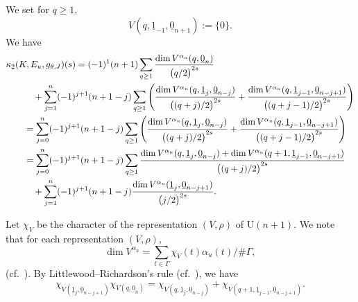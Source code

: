 \documentclass[pdftex]{sigma}
\numberwithin{equation}{section}
\DeclareMathOperator{\Tr}{Tr}
\begin{document}
We set for $q \geq 1$,
\[
 V ( q, \underline{1}_{-1} ,\underline{0}_{n+1} )
 := \{ 0 \}
 .
\]
We have
\begin{align}
 & \kappa_{2} (K, E_{u} , g_{\theta , J} ) (s)
 =
 (-1 )^{1} (n+1)
 \sum_{q \geq 1 }
 \frac{
 \dim V^{\alpha_u} ( q, \underline{0}_{n} )
 }{
 \bigl( q /2 \bigr)^{2s}
 }
 \notag
 \\
 & \qquad\quad{}+
 \sum_{j=1}^{n}
 (-1 )^{j+1} (n+1-j)
 \sum_{q \geq 1 }
 \left(
 \frac{
 \dim V^{\alpha_u} ( q, \underline{1}_{j} ,\underline{0}_{n-j} )
 }{
 \bigl( ( q+j)/2 \bigr)^{2s}
 }
 +
 \frac{
 \dim V^{\alpha_u} ( q, \underline{1}_{j-1} ,\underline{0}_{n-j+1} )
 }{
 \bigl( (q+j-1)/2 \bigr)^{2s}
 }
 \right)
 \notag
 \\
 &\qquad{}=
 \sum_{j=0}^{n}
 (-1 )^{j+1} (n+1-j)
 \sum_{q \geq 1 }
 \left(
 \frac{
 \dim V^{\alpha_u} ( q, \underline{1}_{j} ,\underline{0}_{n-j} )
 }{
 \bigl( ( q+j)/2 \bigr)^{2s}
 }
 +
 \frac{
 \dim V^{\alpha_u} ( q, \underline{1}_{j-1} ,\underline{0}_{n-j+1} )
 }{
 \bigl( (q+j-1)/2 \bigr)^{2s}
 }
 \right)
 \notag
 \\
 &\qquad{}=
 \sum_{j=0}^{n}
 (-1 )^{j+1} (n+1-j)
 \sum_{q \geq 1 }
 \frac{
 \dim V^{\alpha_u} ( q, \underline{1}_{j} ,\underline{0}_{n-j} )
 +
 \dim V^{\alpha_u} ( q+1, \underline{1}_{j-1} ,\underline{0}_{n-j+1} )
 }{
 \bigl( (q+j)/2 \bigr)^{2s}
 }
 \notag
 \\
 & \qquad\quad{}
 +
 \sum_{j=1}^{n}
 (-1 )^{j+1} (n+1-j)
 \frac{
 \dim V^{\alpha_u} ( \underline{1}_{j} ,\underline{0}_{n-j+1} )
 }{
 \bigl( j/2 \bigr)^{2s}
 }
 .
 \notag
\end{align}

Let $\chi_V$ be the character of the representation $(V, \rho)$ of $ \mathrm{U} (n+1)$.
We note that for each representation $(V,\rho)$,
\[
 \dim V^{\alpha_u}
 = \sum_{t \in \Gamma } \chi_{V} ( t ) \alpha_u ( t ) / \# \Gamma
 ,
\]
(cf.~\cite[equation~(2.9)]{Fulton-Harris-04}).
By Littlewood--Richardson's rule (cf.~\cite[Corollary~3]{Fulton-97}), we have
\begin{equation}
 \chi_{V ( \underline{1}_{j} ,\underline{0}_{n-j+1} )}
 \chi_{V ( q, \underline{0}_{n} )}
 =
 \chi_{V ( q, \underline{1}_{j} ,\underline{0}_{n-j} )}
 +
 \chi_{V ( q+1, \underline{1}_{j-1} ,\underline{0}_{n-j+1} )}
 .
 \label{eq:Rich-Litt}
\end{equation}
\end{document}
